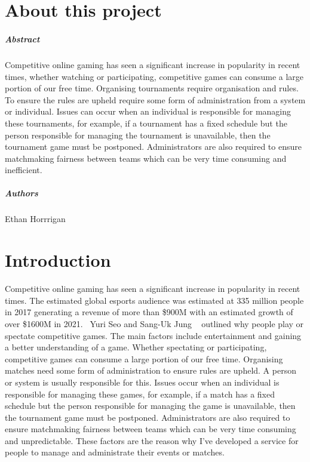 
\chapter*{About this project}
\paragraph{Abstract}

Competitive online gaming has seen a significant increase in popularity in recent times, whether watching or participating, competitive games can consume a large portion of our free time. Organising tournaments require organisation and rules. To ensure the rules are upheld require some form of administration from a system or individual. Issues can occur when an individual is responsible for managing these tournaments, for example, if a tournament has a fixed schedule but the person responsible for managing the tournament is unavailable, then the tournament game must be postponed. Administrators are also required to ensure matchmaking fairness between teams which can be very time consuming and inefficient.

\paragraph{Authors}
Ethan Horrrigan


\chapter{Introduction}
Competitive online gaming has seen a significant increase in popularity in recent times. The estimated global esports audience was estimated at 335 million people in 2017 generating a revenue of more than \$900M with an estimated growth of over \$1600M in 2021.~\cite{sjoblom2019esports} Yuri Seo and Sang-Uk Jung ~\cite{seo2016beyond} outlined why people play or spectate competitive games. The main factors include entertainment and gaining a better understanding of a game. Whether spectating or participating, competitive games can consume a large portion of our free time. Organising matches need some form of administration to ensure rules are upheld. A person or system is usually responsible for this. Issues occur when an individual is responsible for managing these games, for example, if a match has a fixed schedule but the person responsible for managing the game is unavailable, then the tournament game must be postponed. Administrators are also required to ensure matchmaking fairness between teams which can be very time consuming and unpredictable. These factors are the reason why I've developed a service for people to manage and administrate their events or matches.

